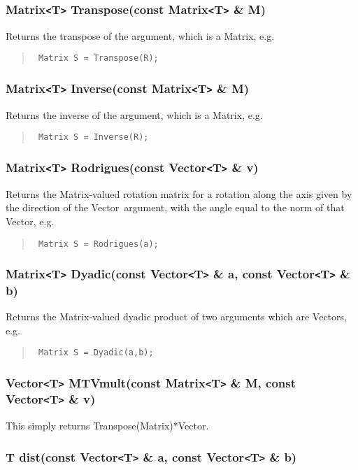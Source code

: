 \documentclass[12pt,twoside]{article}
\newcommand{\Vector}{{Vector}}
\newcommand{\Matrix}{{Matrix}}
\newcommand{\TT}{{\tt<}T{\tt>}}
\begin{document}
\subsubsection{Matrix\TT{} Transpose(const Matrix\TT{} \& M)}

Returns the transpose of the argument, which is a \Matrix, e.g.
\begin{quote}\tt
  Matrix S = Transpose(R);
\end{quote}

\subsubsection{Matrix\TT{} Inverse(const Matrix\TT{} \& M)}

Returns the inverse of the argument, which is a \Matrix, e.g.
\begin{quote}\tt
  Matrix S = Inverse(R);
\end{quote}

\subsubsection{Matrix\TT{} Rodrigues(const Vector\TT{} \& v)}

Returns the \Matrix-valued rotation matrix for a rotation along the
axis given by the direction of the \Vector\ argument, with the angle
equal to the norm of that \Vector, e.g.
\begin{quote}\tt
  Matrix S = Rodrigues(a);
\end{quote}


\subsubsection{Matrix\TT{} Dyadic(const Vector\TT{} \& a, const Vector\TT{} \& b)}

Returns the \Matrix-valued dyadic product of two arguments which are
\Vector s, e.g.
\begin{quote}\tt
  Matrix S = Dyadic(a,b);
\end{quote}


\subsubsection{Vector\TT{} MTVmult(const Matrix\TT{} \& M, const Vector\TT{} \& v)}

This simply returns Transpose(Matrix)*Vector. 

\subsubsection{T dist(const Vector\TT{} \& a, const Vector\TT{} \& b)}
\end{document}
